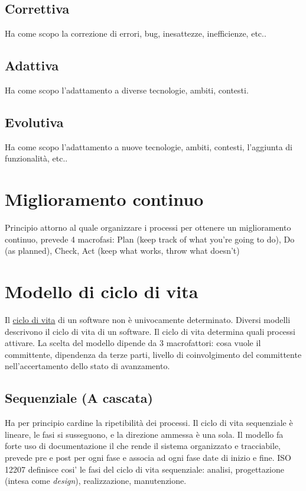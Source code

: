 \documentclass[11pt]{article}
\begin{document}
		\subsection{Correttiva}
		Ha come scopo la correzione di errori, bug, inesattezze, inefficienze, etc..
		
		\subsection{Adattiva}
		Ha come scopo l'adattamento a diverse tecnologie, ambiti, contesti.
		
		\subsection{Evolutiva}
		Ha come scopo l'adattamento a nuove tecnologie, ambiti, contesti, l'aggiunta di funzionalità, etc..

	\section{\LARGE Miglioramento continuo}
	\label{sec:miglioramentocontinuo}
	Principio attorno al quale organizzare i processi per ottenere un miglioramento continuo, prevede 4 macrofasi:
	Plan (keep track of what you're going to do), Do (as planned), Check, Act (keep what works, throw what doesn't)
		
	\section{\LARGE Modello di ciclo di vita}
	\label{sec:modelliciclodivita}
	Il \hyperref[sec:ciclodivita]{ciclo di vita} di un software non è univocamente determinato. Diversi modelli descrivono il ciclo di vita di un software.
	Il ciclo di vita determina quali processi attivare. La scelta del modello dipende da 3 macrofattori: cosa vuole il committente, dipendenza da terze parti, livello di coinvolgimento del committente nell'accertamento dello stato di avanzamento.
	
		\subsection{Sequenziale (A cascata)}
			Ha per principio cardine la ripetibilità dei processi.
			Il ciclo di vita sequenziale è lineare, le fasi si susseguono, e la direzione
			ammessa è una sola.
			Il modello fa forte uso di documentazione il che rende il sistema organizzato e tracciabile, prevede pre e post per ogni fase e associa ad ogni fase date di inizio e fine.  
ISO 12207 definisce cosi' le fasi del ciclo di vita sequenziale: analisi, progettazione (intesa come \textit{design}), realizzazione, manutenzione. 		
		
\end{document}

